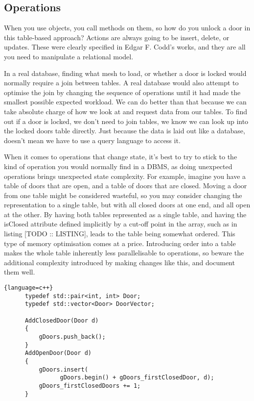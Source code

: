 \documentclass[a4paper,12pt]{book}
\begin{document}
\subsection{Operations}

When you use objects, you call methods on them, so how do you unlock a door in this table-based approach?
Actions are always going to be insert, delete, or updates.
These were clearly specified in Edgar F. Codd's works, and they are all you need to manipulate a relational model.

In a real database, finding what mesh to load, or whether a door is locked would normally require a join between tables.
A real database would also attempt to optimise the join by changing the sequence of operations until it had made the smallest possible expected workload.
We can do better than that because we can take absolute charge of how we look at and request data from our tables.
To find out if a door is locked, we don't need to join tables, we know we can look up into the locked doors table directly.
Just because the data is laid out like a database, doesn't mean we have to use a query language to access it.

When it comes to operations that change state, it's best to try to stick to the kind of operation you would normally find in a DBMS, as doing unexpected operations brings unexpected state complexity.
For example, imagine you have a table of doors that are open, and a table of doors that are closed.
Moving a door from one table might be considered wasteful, so you may consider changing the representation to a single table, but with all closed doors at one end, and all open at the other.
By having both tables represented as a single table, and having the isClosed attribute defined implicitly by a cut-off point in the array, such as in listing [TODO :: LISTING], leads to the table being somewhat ordered.
This type of memory optimisation comes at a price.
Introducing order into a table makes the whole table inherently less parallelisable to operations, so beware the additional complexity introduced by making changes like this, and document them well.

\begin{lstlisting}{language=c++}
      typedef std::pair<int, int> Door;
      typedef std::vector<Door> DoorVector;
      
      AddClosedDoor(Door d)
      {
          gDoors.push_back();
      }
      AddOpenDoor(Door d)
      {
          gDoors.insert(
                gDoors.begin() + gDoors_firstClosedDoor, d);
          gDoors_firstClosedDoors += 1;
      }
\end{lstlisting}
\end{document}
